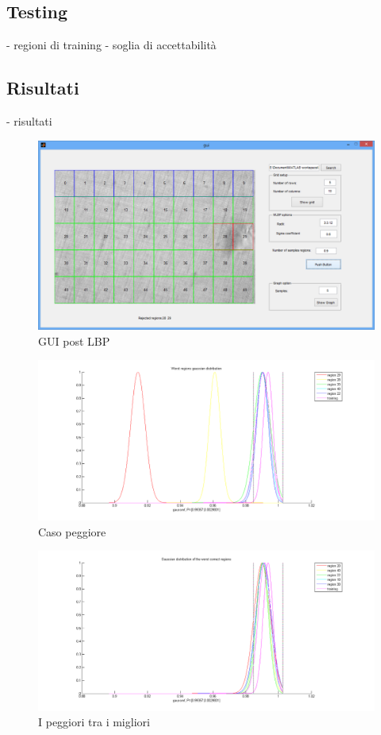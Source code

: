 \subsection{Testing}
- regioni di training
- soglia di accettabilità 

\subsection{Risultati}
- risultati

\begin{figure}[ht]
\begin{center}
\includegraphics[width=.95\textwidth]{img/gui_post_lbp}
\caption{ GUI post LBP }
\label{fig:GUIpostLBP}
\end{center}
\end{figure}





\begin{figure}[ht]
\begin{center}
\includegraphics[width=.95\textwidth]{img/worst_graph}
\caption{ Caso peggiore }
\label{fig:worstGraph}
\end{center}
\end{figure}

\begin{figure}[ht]
\begin{center}
\includegraphics[width=.95\textwidth]{img/worst_best_graph}
\caption{ I peggiori tra i migliori }
\label{fig:worstBestGraph}
\end{center}
\end{figure}
